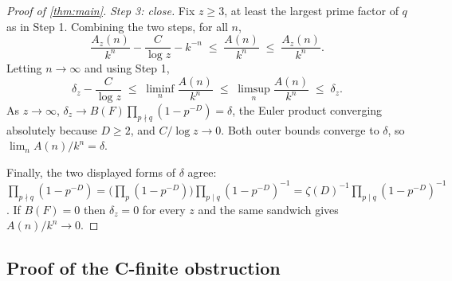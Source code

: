\documentclass[11pt]{amsart}
\theoremstyle{definition}
\theoremstyle{remark}
\begin{document}
\begin{proof}[Proof of \cref{thm:main}]
\emph{Step 3: close.} Fix $z \ge 3$, at least the largest prime factor of $q$ as in Step 1. Combining the two steps, for all $n$,
\[
  \frac{A_z(n)}{k^{n}} - \frac{C}{\log z} - k^{-n}
  \;\le\; \frac{A(n)}{k^{n}} \;\le\; \frac{A_z(n)}{k^{n}} .
\]
Letting $n \to \infty$ and using Step 1,
\[
  \delta_z - \frac{C}{\log z} \;\le\; \liminf_n \frac{A(n)}{k^{n}} \;\le\; \limsup_n \frac{A(n)}{k^{n}} \;\le\; \delta_z .
\]
As $z \to \infty$, $\delta_z \to B(F)\prod_{p \nmid q}(1-p^{-D}) = \delta$, the Euler product converging absolutely because $D \ge 2$, and $C/\log z \to 0$. Both outer bounds converge to $\delta$, so $\lim_n A(n)/k^n = \delta$.

Finally, the two displayed forms of $\delta$ agree: $\prod_{p\nmid q}(1-p^{-D}) = \bigl(\prod_p (1-p^{-D})\bigr)\prod_{p \mid q}(1-p^{-D})^{-1} = \zeta(D)^{-1}\prod_{p\mid q}(1-p^{-D})^{-1}$. If $B(F)=0$ then $\delta_z = 0$ for every $z$ and the same sandwich gives $A(n)/k^n \to 0$.
\end{proof}

\subsection{Proof of the C-finite obstruction}
\end{document}
